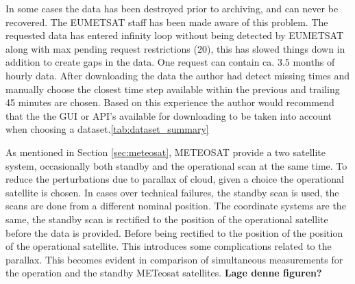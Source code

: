 In some cases the data has been destroyed prior to archiving, and can never be recovered. The EUMETSAT staff has been made aware of this problem. The requested data has entered infinity loop without being detected by EUMETSAT along with max pending request restrictions (20), this has slowed things down in addition to create gaps in the data. One request can contain ca. 3.5 months of hourly data. After downloading the data the author had detect missing times and manually choose the closest time step available within the previous and trailing 45 minutes are chosen. Based on this experience the author would recommend that the the GUI or API's available for downloading to be taken into account when choosing a dataset.\ref{tab:dataset_summary}

As mentioned in Section \ref{sec:meteosat}, METEOSAT provide a two satellite system, occasionally both standby and the operational scan at the same time. To reduce the perturbations due to parallax of cloud, given a choice the operational satellite is chosen. In cases over technical failures, the standby scan is used, the scans are done from a different nominal position. The coordinate systems are the same, the standby scan is rectified to the position of the operational satellite before the data is provided. 
Before being rectified to the position of the position of the operational satellite. This introduces some complications related to the parallax. This becomes evident in comparison of simultaneous measurements for the operation and the standby METeosat satellites. \textbf{Lage denne figuren?}





